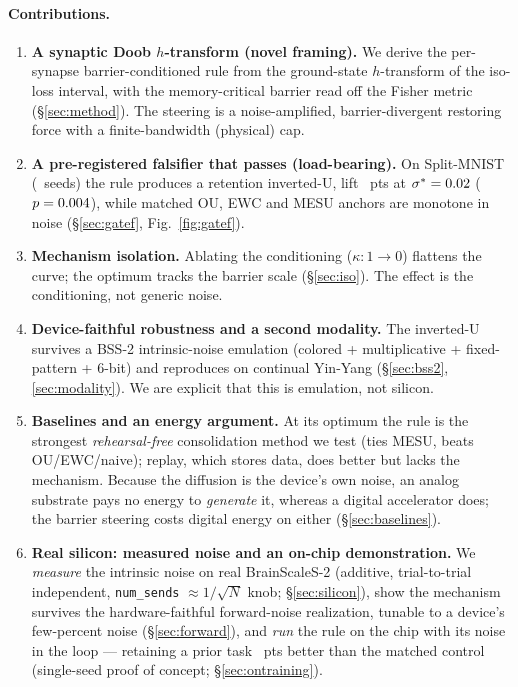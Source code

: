 \documentclass[11pt]{article}
\newcommand{\sigstar}{\sigma^{*}}
\begin{document}
\paragraph{Contributions.}
\begin{enumerate}\itemsep2pt
\item \textbf{A synaptic Doob $h$-transform (novel framing).} We derive the
per-synapse barrier-conditioned rule from the ground-state $h$-transform of the
iso-loss interval, with the memory-critical barrier read off the Fisher metric
(\S\ref{sec:method}). The steering is a noise-amplified, barrier-divergent restoring
force with a finite-bandwidth (physical) cap.
\item \textbf{A pre-registered falsifier that passes (load-bearing).}
On Split-MNIST (\NumSeeds\ seeds) the rule produces a retention inverted-U, lift
\GateFLiftPts\ pts at $\sigstar=\GateFSigStar$ ($p=0.004$), while matched OU,
EWC and MESU anchors are monotone in noise (\S\ref{sec:gatef}, Fig.~\ref{fig:gatef}).
\item \textbf{Mechanism isolation.} Ablating the conditioning ($\kappa:1\!\to\!0$)
flattens the curve; the optimum tracks the barrier scale (\S\ref{sec:iso}). The
effect is the conditioning, not generic noise.
\item \textbf{Device-faithful robustness and a second modality.} The inverted-U
survives a BSS-2 intrinsic-noise emulation (colored + multiplicative +
fixed-pattern + $6$-bit) and reproduces on continual Yin-Yang
(\S\ref{sec:bss2},\ref{sec:modality}). We are explicit that this is emulation, not
silicon.
\item \textbf{Baselines and an energy argument.} At its optimum the rule is the
strongest \emph{rehearsal-free} consolidation method we test (ties MESU, beats
OU/EWC/naive); replay, which stores data, does better but lacks the mechanism.
Because the diffusion is the device's own noise, an analog substrate pays no energy
to \emph{generate} it, whereas a digital accelerator does; the barrier steering costs
digital energy on either (\S\ref{sec:baselines}).
\item \textbf{Real silicon: measured noise and an on-chip demonstration.} We
\emph{measure} the intrinsic noise on real BrainScaleS-2 (additive, trial-to-trial
independent, \texttt{num\_sends} $\approx1/\sqrt{N}$ knob; \S\ref{sec:silicon}), show
the mechanism survives the hardware-faithful forward-noise realization, tunable to a
device's few-percent noise (\S\ref{sec:forward}), and \emph{run} the rule on the chip
with its noise in the loop --- retaining a prior task \SilTrainRetGainPts\ pts better
than the matched control (single-seed proof of concept; \S\ref{sec:ontraining}).
\end{enumerate}
\end{document}
